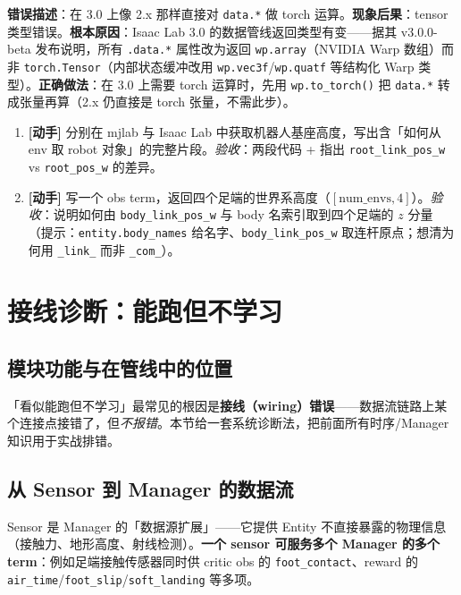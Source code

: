 \begin{pitfall}
\textbf{错误描述}：在 3.0 上像 2.x 那样直接对 \verb|data.*| 做 torch 运算。\textbf{现象后果}：tensor 类型错误。\textbf{根本原因}：Isaac Lab 3.0 的数据管线返回类型有变——据其 v3.0.0-beta 发布说明，所有 \texttt{.data.*} 属性改为返回 \texttt{wp.array}（NVIDIA Warp 数组）而非 \texttt{torch.Tensor}（内部状态缓冲改用 \texttt{wp.vec3f}/\texttt{wp.quatf} 等结构化 Warp 类型）。\textbf{正确做法}：在 3.0 上需要 torch 运算时，先用 \texttt{wp.to\_torch()} 把 \texttt{data.*} 转成张量再算（2.x 仍直接是 torch 张量，不需此步）。
\end{pitfall}

\begin{practice}[本节练习]
\begin{enumerate}
  \item \textbf{[动手]} 分别在 mjlab 与 Isaac Lab 中获取机器人基座高度，写出含「如何从 env 取 robot 对象」的完整片段。\emph{验收}：两段代码 + 指出 \verb|root_link_pos_w| vs \verb|root_pos_w| 的差异。
  \item \textbf{[动手]} 写一个 obs term，返回四个足端的世界系高度（$[\text{num\_envs},4]$）。\emph{验收}：说明如何由 \verb|body_link_pos_w| 与 body 名索引取到四个足端的 $z$ 分量（提示：\verb|entity.body_names| 给名字、\verb|body_link_pos_w| 取连杆原点；想清为何用 \verb|_link_| 而非 \verb|_com_|）。
\end{enumerate}
\end{practice}

\section{接线诊断：能跑但不学习}
\label{sec:rlmc-mgr-debug}

\subsection{模块功能与在管线中的位置}

「看似能跑但不学习」最常见的根因是\textbf{接线（wiring）错误}——数据流链路上某个连接点接错了，但\emph{不报错}。本节给一套系统诊断法，把前面所有时序/Manager 知识用于实战排错。

\subsection{从 Sensor 到 Manager 的数据流}

Sensor 是 Manager 的「数据源扩展」——它提供 Entity 不直接暴露的物理信息（接触力、地形高度、射线检测）。\textbf{一个 sensor 可服务多个 Manager 的多个 term}：例如足端接触传感器同时供 critic obs 的 \verb|foot_contact|、reward 的 \verb|air_time|/\verb|foot_slip|/\verb|soft_landing| 等多项。

